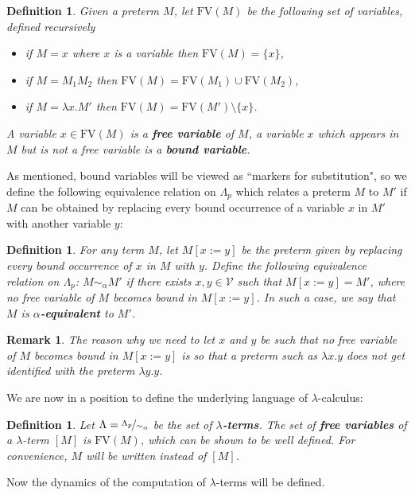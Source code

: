 \documentclass[english,letter paper,12pt,leqno]{article}
\newcommand{\scr}[1]{\mathscr{#1}}
\newtheorem{defn}[theorem]{Definition}
\theoremstyle{example}
\newtheorem{remark}[theorem]{Remark}
\numberwithin{equation}{section}
\begin{document}
\begin{defn}
	Given a preterm $M$, let $\text{FV}(M)$ be the following set of variables, defined recursively
	\begin{itemize}
		\item if $M = x$ where $x$ is a variable then $\text{FV}(M) = \lbrace x \rbrace$,
		\item if $M = M_1M_2$ then $\text{FV}(M) = \text{FV}(M_1) \cup \text{FV}(M_2)$,
		\item if $M = \lambda x. M'$ then $\text{FV}(M) = \text{FV}(M') \setminus \lbrace x \rbrace$.
	\end{itemize}
	A variable $x \in \text{FV}(M)$ is a \textbf{free variable} of $M$, a variable $x$ which appears in $M$ but is not a free variable is a \textbf{bound variable}.
\end{defn}
As mentioned, bound variables will be viewed as ``markers for substitution", so we define the following equivalence relation on $\Lambda_p$ which relates a preterm $M$ to $M'$ if $M$ can be obtained by replacing every bound occurrence of a variable $x$ in $M'$ with another variable $y$:
\begin{defn}
	For any term $M$, let $M[x := y]$ be the preterm given by replacing every bound occurrence of $x$ in $M$ with $y$. Define the following equivalence relation on $\Lambda_p$: $M \sim_\alpha M'$ if there exists $x,y \in \scr{V}$ such that $M[x := y] = M'$, where no free variable of $M$ becomes bound in $M[x := y]$. In such a case, we say that $M$ is \textbf{$\alpha$-equivalent} to $M'$.
\end{defn}
\begin{remark}
	The reason why we need to let $x$ and $y$ be such that no free variable of $M$ becomes bound in $M[x:=y]$ is so that a preterm such as $\lambda x. y$ does not get identified with the preterm $\lambda y. y$.
\end{remark}
We are now in a position to define the underlying language of $\lambda$-calculus:
\begin{defn}
	Let $\Lambda = \nicefrac{\Lambda_p}{\sim_\alpha}$ be the set of \textbf{$\lambda$-terms}. The set of \textbf{free variables} of a $\lambda$-term $[M]$ is $\text{FV}(M)$, which can be shown to be well defined. For convenience, $M$ will be written instead of $[M]$.
\end{defn}
Now the dynamics of the computation of $\lambda$-terms will be defined.
\end{document}
